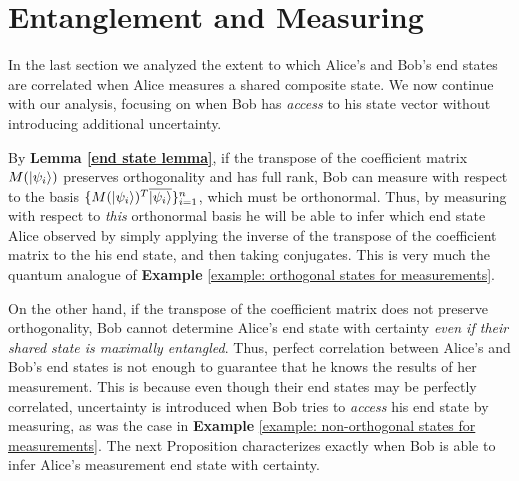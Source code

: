 \pagebreak

\section{Entanglement and Measuring}
In the last section we analyzed the extent to which Alice's and Bob's end states are correlated when Alice measures a shared composite state. We now continue with our analysis, focusing on when Bob has {\emph{access}} to his state vector without introducing additional uncertainty. 

By \textbf{Lemma \ref{end state lemma}}, if the transpose of the coefficient matrix $M(\ket{\psi_i})$ preserves orthogonality and has full rank, Bob can measure with respect to the basis $\{M(\ket{\psi_i})^T \overline{\ket{\psi_i}}\}_{i=1}^n$, which must be orthonormal. Thus, by measuring with respect to {\emph{this}} orthonormal basis he will be able to infer which end state Alice observed by simply applying the inverse of the transpose of the coefficient matrix to the his end state, and then taking conjugates. This is very much the quantum analogue of {\bf{Example}} \ref{example: orthogonal states for measurements}.

On the other hand, if the transpose of the coefficient matrix does not preserve orthogonality, Bob cannot determine Alice's end state with certainty {\emph{even if their shared state is maximally entangled}}.  Thus, perfect correlation between Alice's and Bob's end states is not enough to guarantee that he knows the results of her measurement.  This is because even though their end states may be perfectly correlated, uncertainty is introduced when Bob tries to {\emph{access}} his end state by measuring, as was the case in {\bf{Example}} \ref{example: non-orthogonal states for measurements}.  The next Proposition characterizes exactly when Bob is able to infer Alice's measurement end state with certainty.  


